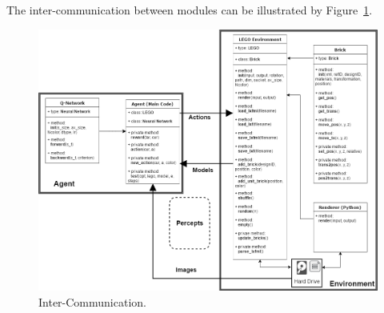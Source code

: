 \documentclass[a4paper]{article}
\begin{document}
            The inter-communication between modules can be illustrated by Figure~\ref{fig:inter-communication}. 
            
            \begin{figure}[h]
                \centering
                \includegraphics[height=0.9\textwidth, angle=-90]{inter-communication.png}
                \caption{Inter-Communication.}
                \label{fig:inter-communication}
            \end{figure}
            
            
            
            
            
\end{document}
